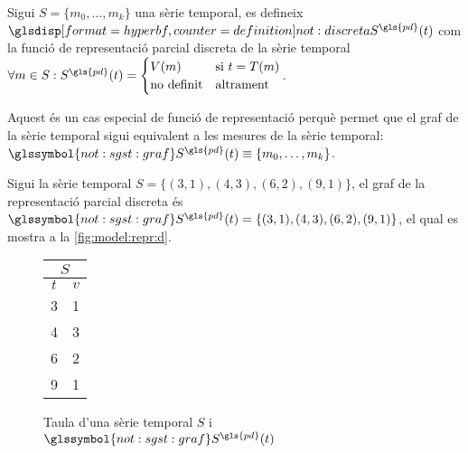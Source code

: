 \begin{definition}
  Sigui $S=\{m_0,\ldots,m_k\}$ una sèrie temporal, es defineix
  $\glsdispdef{not:discreta}{S^{\gls{pd}}(t)}$ com la funció de
  representació parcial discreta de la sèrie temporal $\forall m \in
  S: S^{\gls{pd}}(t) =
  \begin{cases}
    V(m) & \text{si }  t=T(m) \\
    \text{no definit} & \text{altrament}
  \end{cases}$.
\end{definition}

Aquest és un cas especial de funció de representació perquè permet que
el graf de la sèrie temporal sigui equivalent a les mesures de la
sèrie temporal: $\glssymbol{not:sgst:graf} S^{\gls{pd}}(t) \equiv
\{m_0,\ldots,m_k\}$.







\begin{example}
  Sigui la sèrie temporal $S=\{ (3,1), (4,3), (6,2), (9,1) \}$, el
  graf de la representació parcial discreta és
  $\glssymbol{not:sgst:graf} S^{\gls{pd}}(t)=\{ (3,1), (4,3), (6,2), (9,1) \}$,
  el qual es mostra a la \autoref{fig:model:repr:d}.


  \begin{figure}[tp]
  \centering
  \begin{tabular}[c]{|c|c|}
    \multicolumn{2}{c}{$S$} \\ \hline
    $t$  & $v$ \\ \hline
    3  & 1 \\
    4  & 3 \\
    6  & 2 \\
    9  & 1 \\ \hline
  \end{tabular} \qquad
   \caption{Taula d'una sèrie temporal $S$ i
     $\glssymbol{not:sgst:graf} S^{\gls{pd}}(t)$}
  \label{fig:model:repr:d}
  \end{figure}
\end{example}




